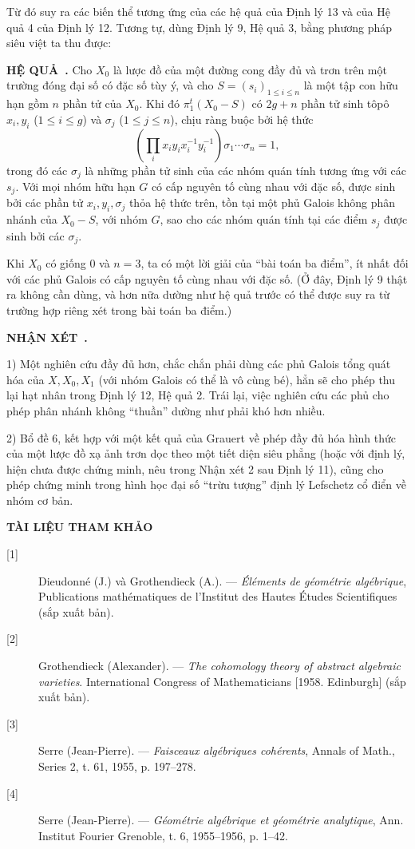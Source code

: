 \documentclass[11pt,twoside,openany]{book}
\numberwithin{equation}{section}
\newcommand{\src}[1]{%
  \phantomsection\hypertarget{src:\fgasourceid:#1}{}%
  \marginpar{\raggedleft\footnotesize\sffamily #1}%
}
\newcommand{\fgasourceid}{unset}
\newcommand{\result}[2]{\par\medskip\noindent\textbf{#1\if\relax\detokenize{#2}\relax\else\ #2\fi.}\quad}
\begin{document}
Từ đó suy ra các biến thể tương ứng của các hệ quả của Định lý 13 và của Hệ
quả 4 của Định lý 12. Tương tự, dùng Định lý 9, Hệ quả 3, bằng phương pháp
siêu việt ta thu được:

\result{HỆ QUẢ}{} Cho $X_0$ là lược đồ của một đường cong đầy đủ và trơn trên
một trường đóng đại số có đặc số tùy ý, và cho
$S=(s_i)_{1\le i\le n}$ là một tập con hữu hạn gồm $n$ phần tử của $X_0$. Khi
đó $\pi_1^t(X_0-S)$ có $2g+n$ phần tử sinh tôpô
$x_i,y_i$ ($1\le i\le g$) và $\sigma_j$ ($1\le j\le n$), chịu ràng buộc bởi
hệ thức
\[
  \left(\prod_i x_i y_i x_i^{-1}y_i^{-1}\right)
  \sigma_1\cdots\sigma_n=1,
\]
trong đó các $\sigma_j$ là những phần tử sinh của các nhóm quán tính tương ứng
với các $s_j$. Với mọi nhóm hữu hạn $G$ có cấp nguyên tố cùng nhau với đặc số,
được sinh bởi các phần tử $x_i,y_i,\sigma_j$ thỏa hệ thức trên, tồn tại một
phủ Galois không phân nhánh của $X_0-S$, với nhóm $G$, sao cho các nhóm quán
tính tại các điểm $s_j$ được sinh bởi các $\sigma_j$.

Khi $X_0$ có giống 0 và $n=3$, ta có một lời giải của “bài toán ba điểm”, ít
nhất đối với các phủ Galois có cấp nguyên tố cùng nhau với đặc số. (Ở đây,
Định lý 9 thật ra không cần dùng, và hơn nữa dường như hệ quả trước có thể được
suy ra từ trường hợp riêng xét trong bài toán ba điểm.)

\src{220}
\result{NHẬN XÉT}{}

1) Một nghiên cứu đầy đủ hơn, chắc chắn phải dùng các phủ Galois tổng quát hóa
của $X,X_0,X_1$ (với nhóm Galois có thể là vô cùng bé), hẳn sẽ cho phép thu
lại hạt nhân trong Định lý 12, Hệ quả 2. Trái lại, việc nghiên cứu các phủ cho
phép phân nhánh không “thuần” dường như phải khó hơn nhiều.

2) Bổ đề 6, kết hợp với một kết quả của Grauert về phép đầy đủ hóa hình thức
của một lược đồ xạ ảnh trơn dọc theo một tiết diện siêu phẳng (hoặc với định
lý, hiện chưa được chứng minh, nêu trong Nhận xét 2 sau Định lý 11), cũng cho
phép chứng minh trong hình học đại số “trừu tượng” định lý Lefschetz cổ điển về
nhóm cơ bản.

\begin{center}
  \textbf{TÀI LIỆU THAM KHẢO}
\end{center}

\begin{description}
  \item[{[1]}] Dieudonné (J.) và Grothendieck (A.). --- \emph{Éléments de
    géométrie algébrique}, Publications mathématiques de l'Institut des Hautes
    Études Scientifiques (sắp xuất bản).
  \item[{[2]}] Grothendieck (Alexander). --- \emph{The cohomology theory of
    abstract algebraic varieties}. International Congress of Mathematicians
    [1958. Edinburgh] (sắp xuất bản).
  \item[{[3]}] Serre (Jean-Pierre). --- \emph{Faisceaux algébriques
    cohérents}, Annals of Math., Series 2, t. 61, 1955, p. 197--278.
  \item[{[4]}] Serre (Jean-Pierre). --- \emph{Géométrie algébrique et
    géométrie analytique}, Ann. Institut Fourier Grenoble, t. 6, 1955--1956,
    p. 1--42.
\end{description}
\end{document}
